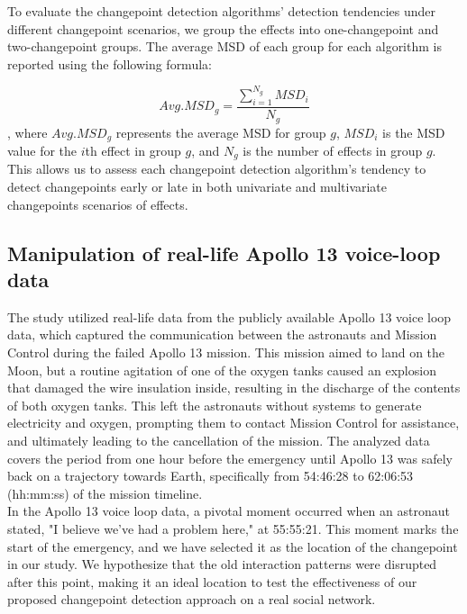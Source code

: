\documentclass[]{interact}
\theoremstyle{plain}%
\theoremstyle{definition}
\theoremstyle{remark}
\begin{document}
{	To evaluate the changepoint detection algorithms' detection tendencies under different changepoint scenarios, we group the effects into one-changepoint and two-changepoint groups. The average MSD of each group for each algorithm is reported using the following formula:
	
	\begin{equation} \label{12}
		Avg.MSD_g = \frac{\sum_{i=1}^{N_g} MSD_i}{N_g}
	\end{equation}
	, where $Avg.MSD_g$ represents the average MSD for group $g$, $MSD_i$ is the MSD value for the $i$th effect in group $g$, and $N_g$ is the number of effects in group $g$. This allows us to assess each changepoint detection algorithm's tendency to detect changepoints early or late in both univariate and multivariate changepoints scenarios of effects.
	
	\subsection{Manipulation of real-life Apollo 13 voice-loop data}
	
	\hspace{0.2cm} The study utilized real-life data from the publicly available Apollo 13 voice loop data, which captured the communication between the astronauts and Mission Control during the failed Apollo 13 mission. This mission aimed to land on the Moon, but a routine agitation of one of the oxygen tanks caused an explosion that damaged the wire insulation inside, resulting in the discharge of the contents of both oxygen tanks. This left the astronauts without systems to generate electricity and oxygen, prompting them to contact Mission Control for assistance, and ultimately leading to the cancellation of the mission. The analyzed data covers the period from one hour before the emergency until Apollo 13 was safely back on a trajectory towards Earth, specifically from 54:46:28 to 62:06:53 (hh:mm:ss) of the mission timeline. \\
	
	In the Apollo 13 voice loop data, a pivotal moment occurred when an astronaut stated, "I believe we've had a problem here," at 55:55:21. This moment marks the start of the emergency, and we have selected it as the location of the changepoint in our study. We hypothesize that the old interaction patterns were disrupted after this point, making it an ideal location to test the effectiveness of our proposed changepoint detection approach on a real social network. \\
	
}
\end{document}

